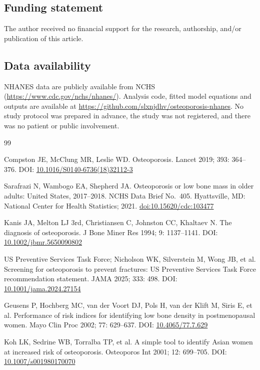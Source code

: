 \documentclass[11pt,a4paper]{article}
\begin{document}
\subsection*{Funding statement}
The author received no financial support for the research, authorship, and/or publication of this article.
\subsection*{Data availability}
NHANES data are publicly available from NCHS (\url{https://www.cdc.gov/nchs/nhanes/}). Analysis code, fitted model equations and outputs are available at \url{https://github.com/slxnjdhv/osteoporosis-nhanes}. No study protocol was prepared in advance, the study was not registered, and there was no patient or public involvement.

\begin{thebibliography}{99}\small

 Compston JE, McClung MR, Leslie WD. Osteoporosis. Lancet 2019; 393: 364--376. DOI: \href{https://doi.org/10.1016/S0140-6736(18)32112-3}{10.1016/S0140-6736(18)32112-3}

 Sarafrazi N, Wambogo EA, Shepherd JA. Osteoporosis or low bone mass in older adults: United States, 2017--2018. NCHS Data Brief No.\ 405. Hyattsville, MD: National Center for Health Statistics; 2021. \href{https://dx.doi.org/10.15620/cdc:103477}{doi:10.15620/cdc:103477}

 Kanis JA, Melton LJ 3rd, Christiansen C, Johnston CC, Khaltaev N. The diagnosis of osteoporosis. J Bone Miner Res 1994; 9: 1137--1141. DOI: \href{https://doi.org/10.1002/jbmr.5650090802}{10.1002/jbmr.5650090802}

 US Preventive Services Task Force; Nicholson WK, Silverstein M, Wong JB, et al. Screening for osteoporosis to prevent fractures: US Preventive Services Task Force recommendation statement. JAMA 2025; 333: 498. DOI: \href{https://doi.org/10.1001/jama.2024.27154}{10.1001/jama.2024.27154}

 Geusens P, Hochberg MC, van der Voort DJ, Pols H, van der Klift M, Siris E, et al. Performance of risk indices for identifying low bone density in postmenopausal women. Mayo Clin Proc 2002; 77: 629--637. DOI: \href{https://doi.org/10.4065/77.7.629}{10.4065/77.7.629}

 Koh LK, Sedrine WB, Torralba TP, et al. A simple tool to identify Asian women at increased risk of osteoporosis. Osteoporos Int 2001; 12: 699--705. DOI: \href{https://doi.org/10.1007/s001980170070}{10.1007/s001980170070}


\end{thebibliography}
\end{document}
